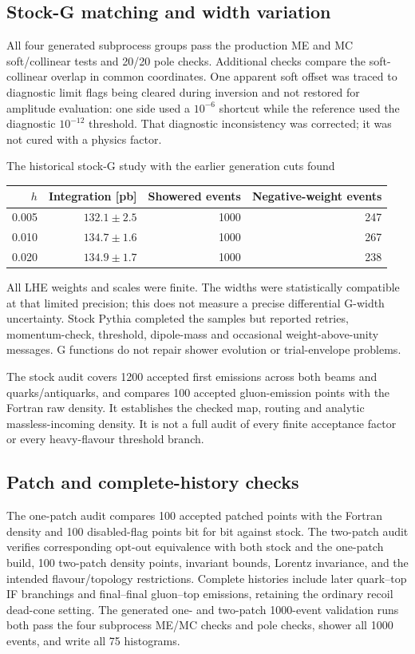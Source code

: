 \documentclass[11pt,a4paper]{article}
\begin{document}
\subsection{Stock-G matching and width variation}

All four generated subprocess groups pass the production ME and MC
soft/collinear tests and 20/20 pole checks. Additional checks compare the
soft-collinear overlap in common coordinates. One apparent soft offset
was traced to diagnostic limit flags being cleared during inversion and
not restored for amplitude evaluation: one side used a $10^{-6}$ shortcut
while the reference used the diagnostic $10^{-12}$ threshold. That
diagnostic inconsistency was corrected; it was not cured with a physics
factor.

The historical stock-G study with the earlier generation cuts found
\begin{center}
\begin{tabular}{@{}rrrr@{}}
\toprule
$h$ & Integration [pb] & Showered events & Negative-weight events\\
\midrule
0.005 & $132.1\pm2.5$ & 1000 & 247\\
0.010 & $134.7\pm1.6$ & 1000 & 267\\
0.020 & $134.9\pm1.7$ & 1000 & 238\\
\bottomrule
\end{tabular}
\end{center}
All LHE weights and scales were finite. The widths were statistically
compatible at that limited precision; this does not measure a precise
differential G-width uncertainty. Stock Pythia completed the samples but
reported retries, momentum-check, threshold, dipole-mass and occasional
weight-above-unity messages. G functions do not repair shower evolution
or trial-envelope problems.

The stock audit covers 1200 accepted first emissions across both beams and
quarks/antiquarks, and compares 100 accepted gluon-emission points with the
Fortran raw density. It establishes the checked map, routing and analytic
massless-incoming density. It is not a full audit of every finite
acceptance factor or every heavy-flavour threshold branch.

\subsection{Patch and complete-history checks}

The one-patch audit compares 100 accepted patched points with the Fortran
density and 100 disabled-flag points bit for bit against stock. The
two-patch audit verifies corresponding opt-out equivalence with both stock
and the one-patch build, 100 two-patch density points, invariant bounds,
Lorentz invariance, and the intended flavour/topology restrictions.
Complete histories include later quark--top IF branchings and final--final
gluon--top emissions, retaining the ordinary recoil dead-cone setting.
The generated one- and two-patch 1000-event validation runs both pass the
four subprocess ME/MC checks and pole checks, shower all 1000 events, and
write all 75 histograms.
\end{document}
